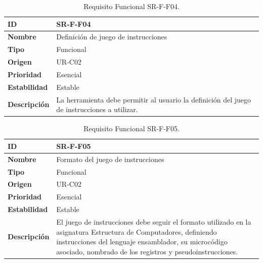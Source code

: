 \begin{center}
\begin{table}[htbp]
\centering
\begin{tabular}{@{}p{2.5cm} p{9cm}@{}} 
\toprule
\textbf{ID} 				& SR-F-F04 \\
\midrule
\textbf{Nombre} 			& Definición de juego de instrucciones \\
\midrule
\textbf{Tipo} 			& Funcional \\
\midrule
\textbf{Origen} 			& UR-C02 \\
\midrule
\textbf{Prioridad}		& Esencial \\
\midrule
\textbf{Estabilidad} 		& Estable \\
\midrule
\textbf{Descripción} 	& La herramienta debe permitir al usuario la definición del juego de instrucciones a utilizar.\\
\bottomrule
\end{tabular}
\caption{Requisito Funcional SR-F-F04.}
\label{tab:srff04}
\end{table}
\end{center}

\begin{center}
\begin{table}[htbp]
\centering
\begin{tabular}{@{}p{2.5cm} p{9cm}@{}} 
\toprule
\textbf{ID} 				& SR-F-F05 \\
\midrule
\textbf{Nombre} 			& Formato del juego de instrucciones\\
\midrule
\textbf{Tipo} 			& Funcional \\
\midrule
\textbf{Origen} 			& UR-C02 \\
\midrule
\textbf{Prioridad}		& Esencial \\
\midrule
\textbf{Estabilidad} 		& Estable \\
\midrule
\textbf{Descripción} 	& El juego de instrucciones debe seguir el formato utilizado en la asignatura Estructura de Computadores, definiendo instrucciones del lenguaje ensamblador, su microcódigo asociado, nombrado de los registros y pseudoinstrucciones. \\
\bottomrule
\end{tabular}
\caption{Requisito Funcional SR-F-F05.}
\label{tab:srff05}
\end{table}
\end{center}

